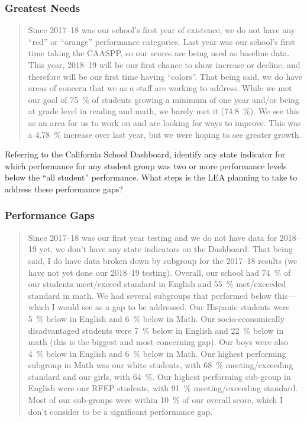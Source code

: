 \documentclass{article}
\newcounter{goal}[section]
\begin{document}
\subsubsection{Greatest Needs}
\begin{quote}
	Since 2017--18 was our school's first year of existence, we do not have any ``red'' or ``orange'' performance categories. Last year was our school's first time taking the CAASPP, so our scores are being used as baseline data. This year, 2018--19 will be our first chance to show increase or decline, and therefore will be our first time having ``colors''. That being said, we do have areas of concern that we as a staff are working to address. While we met our goal of \SI{75}{\percent} of students growing a minimum of one year and/or being at grade level in reading and math, we barely met it (\SI{74.8}{\percent}). We see this as an area for us to work on and are looking for ways to improve. This was a \SI{4.78}{\percent} increase over last year, but we were hoping to see greater growth.
\end{quote}

Referring to the California School Dashboard, identify any state indicator for which performance for any student group was two or more performance levels below the ``all student'' performance. What steps is the LEA planning to take to address these performance gaps?
\subsubsection{Performance Gaps}
\begin{quote}
	Since 2017--18 was our first year testing and we do not have data for 2018--19 yet, we don't have any state indicators on the Dashboard. That being said, I do have data broken down by subgroup for the 2017--18 results (we have not yet done our 2018--19 testing). Overall, our school had \SI{74}{\percent} of our students meet/exceed standard in English and \SI{55}{\percent} met/exceeded standard in math. We had several subgroups that performed below this---which I would see as a gap to be addressed. Our Hispanic students were \SI{5}{\percent} below in English and \SI{6}{\percent} below in Math. Our socio-economically disadvantaged students were \SI{7}{\percent} below in English and \SI{22}{\percent} below in math (this is the biggest and most concerning gap). Our boys were also \SI{4}{\percent} below in English and \SI{6}{\percent} below in Math. Our highest performing subgroup in Math was our white students, with \SI{68}{\percent} meeting/exceeding standard and our girls, with \SI{64}{\percent}. Our highest performing sub-group in English were our RFEP students, with \SI{91}{\percent} meeting/exceeding standard. Most of our sub-groups were within \SI{10}{\percent} of our overall score, which I don't consider to be a significant performance gap.
\end{quote}
\end{document}
